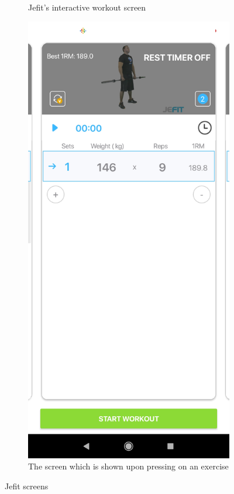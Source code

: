 \documentclass{l4proj}
\begin{document}
\begin{figure}[H]
\begin{subfigure}{0.3\textwidth}
        \caption{Jefit's interactive workout screen} 
    \end{subfigure}
    \begin{subfigure}{0.3\textwidth}
      \includegraphics[width=\textwidth]{jefit_2.png}    
      \caption{The screen which is shown upon pressing on an exercise}
    \end{subfigure}
    \caption{Jefit screens}
    \label{fig:jefit}
\end{figure}
\end{document}
